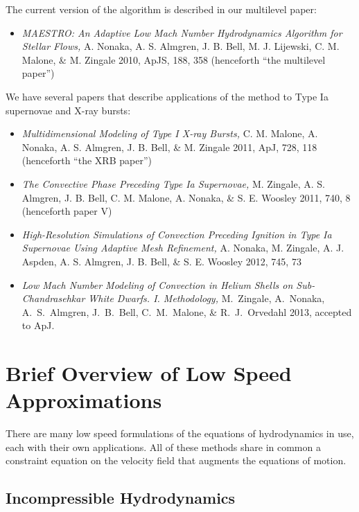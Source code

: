\noindent The current version of the algorithm is described in our
multilevel paper:
\begin{itemize}
\item {\em MAESTRO: An Adaptive Low Mach Number Hydrodynamics Algorithm for Stellar
  Flows,} A. Nonaka, A. S. Almgren, J. B. Bell, M. J. Lijewski, C. M. Malone,
  \& M. Zingale 2010, ApJS, 188, 358 (henceforth ``the multilevel paper'')
\end{itemize}

\noindent We have several papers that describe applications of the
method to Type Ia supernovae and X-ray bursts:
\begin{itemize}
\item {\em Multidimensional Modeling of Type I X-ray Bursts,}
  C. M. Malone, A. Nonaka, A. S. Almgren, J. B. Bell, \& M. Zingale 2011,
  ApJ, 728, 118 (henceforth ``the XRB paper'')
\item {\em The Convective Phase Preceding Type Ia Supernovae,}
  M. Zingale, A. S. Almgren, J. B. Bell, C. M. Malone, A. Nonaka, \& S. E. Woosley 2011,
  740, 8 (henceforth paper V)
\item {\em High-Resolution Simulations of Convection Preceding Ignition in
  Type Ia Supernovae Using Adaptive Mesh Refinement,}
  A. Nonaka, M. Zingale, A. J. Aspden, A. S. Almgren, J. B. Bell, \& S. E. Woosley 2012, 
  745, 73
\item {\em Low Mach Number Modeling of Convection in Helium Shells on 
Sub-Chandrasehkar White Dwarfs. I. Methodology,} 
M.~Zingale, A.~Nonaka, A.~S.~Almgren, J.~B.~Bell, C.~M.~Malone, \&
R.~J.~Orvedahl 2013, accepted to ApJ.

\end{itemize}


\section{Brief Overview of Low Speed Approximations}

There are many low speed formulations of the equations of hydrodynamics
in use, each with their own applications.  All of these methods share in
common a constraint equation on the velocity field that augments the
equations of motion.  

\subsection{Incompressible Hydrodynamics}

